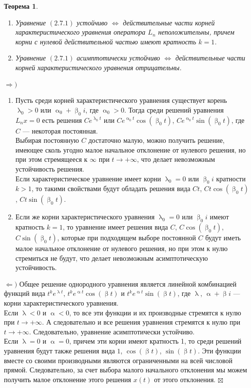 \documentclass[a4paper, 12pt]{report}
\newenvironment{Proof} %
{\par\noindent{$\blacklozenge$}} %
{\hfill$\scriptstyle\boxtimes$}
\renewcommand{\alpha}{\upalpha}
\renewcommand{\beta}{\upbeta}
\renewcommand{\lambda}{\uplambda}
\newtheorem*{theorem}{Теорема}
\begin{document}
\begin{theorem}
	\begin{enumerate}
		\item Уравнение $(2.7.1)$ устойчиво $\Longleftrightarrow$ действительные части корней характеристического уравнения оператора $L_n$ неположительны, причем корни с нулевой действительной частью имеют кратность $k = 1$.
		\item Уравнение $(2.7.1)$ асимптотически устойчиво $\Longleftrightarrow$ действительные части корней характеристического уравнения отрицательны.
	\end{enumerate}
\end{theorem}\begin{Proof}
$\Rightarrow)$\begin{enumerate}
	\item Пусть среди корней характеристического уравнения существует корень $\lambda_0 > 0$ или $\alpha_0 + \beta_0i$, где $\alpha_0 > 0$. Тогда среди решений уравнения $L_nx = 0$ есть решения $Ce^{\lambda_0 t}$ или $Ce^{\alpha_0t}\cos(\beta_0 t)$, $Ce^{\alpha_0t}\sin(\beta_0 t)$, где $C$ --- некоторая постоянная.\\
	Выбирая постоянную $C$ достаточно малую, можно получить решение, имеющее сколь угодно малое начальное отклонение от нулевого решения, но при этом стремящееся к $\infty$ при $t\rightarrow +\infty$, что делает невозможным устойчивость решения.\\ Если характеристическое уравнение имеет корни $\lambda_0 = 0$ или $\beta_0 i$ кратности $k > 1$, то такими свойствами будут обладать решения вида $Ct$, $Ct\cos(\beta_0t)$, $Ct\sin(\beta_0t)$.
	\item Если же корни характеристического уравнения $\lambda_0 = 0$ или $\beta_0i$ имеют кратность $k = 1$, то уравнение имеет решения вида $C$, $C\cos(\beta_0t)$, $C\sin(\beta_0t)$, которые при подходящем выборе постоянной $C$ будут иметь малое начальное отклонение от нулевого решения, но при этом к нулю стремиться не будут, что делает невозможным асимптотическую устойчивость.
\end{enumerate}
$\Leftarrow)$ Общее решение однородного уравнения является линейной комбинацией функций вида $t^ke^{\lambda t}$, $t^ke^{\alpha t}\cos(\beta t)$ и $t^ke^{\alpha t}\sin(\beta t)$, где $\lambda$, $\alpha + \beta i$ --- корни характеристического уравнения.\\ Если $\lambda < 0$ и $\alpha < 0$, то все эти функции и их производные стремятся к нулю при $t \rightarrow +\infty$. А следовательно и все решения уравнения стремятся к нулю при $t \rightarrow +\infty$. Следовательно, уравнение асимптотически устойчиво.\\
Если $\lambda = 0$ и $\alpha = 0$, причем эти корни имеют кратность 1, то среди решений уравнения будут также решения вида $1$, $\cos(\beta t)$, $\sin(\beta t)$. Эти функции вместе со своими производными являются ограниченными на всей числовой прямой. Следовательно, за счет выбора малого начального отклонения мы можем получить малое отклонение этого решения $x(t)$ от этого отклонения.
\end{Proof}
\end{document}
